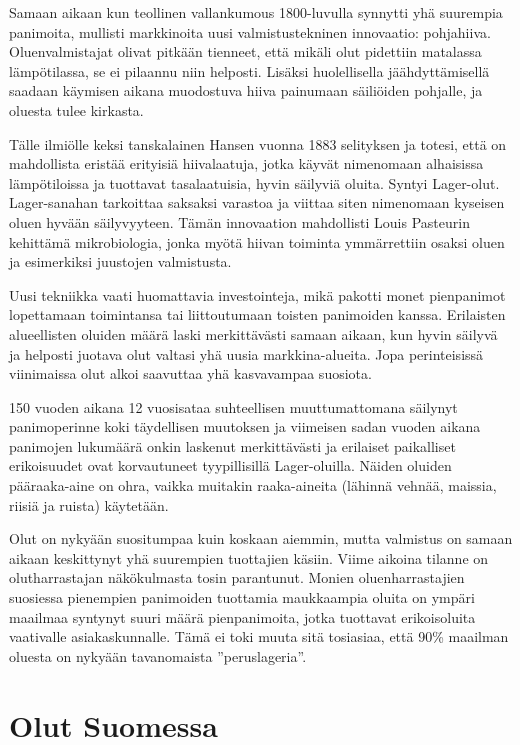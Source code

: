 \documentclass[a4paper,11pt]{report}
\begin{document}
Samaan aikaan kun teollinen vallankumous 1800-luvulla synnytti yhä suurempia panimoita, mullisti markkinoita uusi valmistustekninen innovaatio: pohjahiiva. Oluenvalmistajat olivat pitkään tienneet, että mikäli olut pidettiin matalassa lämpötilassa, se ei pilaannu niin helposti. Lisäksi huolellisella jäähdyttämisellä saadaan käymisen aikana muodostuva hiiva painumaan säiliöiden pohjalle, ja oluesta tulee kirkasta.

Tälle ilmiölle keksi tanskalainen Hansen vuonna 1883 selityksen ja totesi, että on mahdollista eristää erityisiä hiivalaatuja, jotka käyvät nimenomaan alhaisissa lämpötiloissa ja tuottavat tasalaatuisia, hyvin säilyviä oluita. Syntyi Lager-olut. Lager-sanahan tarkoittaa saksaksi varastoa ja viittaa siten nimenomaan kyseisen oluen hyvään säilyvyyteen. Tämän innovaation mahdollisti Louis Pasteurin kehittämä mikrobiologia, jonka myötä hiivan toiminta ymmärrettiin osaksi oluen ja esimerkiksi juustojen valmistusta.

Uusi tekniikka vaati huomattavia investointeja, mikä pakotti monet pienpanimot lopettamaan toimintansa tai liittoutumaan toisten panimoiden kanssa. Erilaisten alueellisten oluiden määrä laski merkittävästi samaan aikaan, kun hyvin säilyvä ja helposti juotava olut valtasi yhä uusia markkina-alueita. Jopa perinteisissä viinimaissa olut alkoi saavuttaa yhä kasvavampaa suosiota.

150 vuoden aikana 12 vuosisataa suhteellisen muuttumattomana säilynyt panimoperinne koki täydellisen muutoksen ja viimeisen sadan vuoden aikana panimojen lukumäärä onkin laskenut merkittävästi ja erilaiset paikalliset erikoisuudet ovat korvautuneet tyypillisillä Lager-oluilla. Näiden oluiden pääraaka-aine on ohra, vaikka muitakin raaka-aineita (lähinnä vehnää, maissia, riisiä ja ruista) käytetään.

Olut on nykyään suositumpaa kuin koskaan aiemmin, mutta valmistus on samaan aikaan keskittynyt yhä suurempien tuottajien käsiin. Viime aikoina tilanne on olutharrastajan näkökulmasta tosin parantunut. Monien oluenharrastajien suosiessa pienempien panimoiden tuottamia maukkaampia oluita on ympäri maailmaa syntynyt suuri määrä pienpanimoita, jotka tuottavat erikoisoluita vaativalle asiakaskunnalle. Tämä ei toki muuta sitä tosiasiaa, että 90\% maailman oluesta on nykyään tavanomaista ''peruslageria''.

\section{Olut Suomessa}
\end{document}
